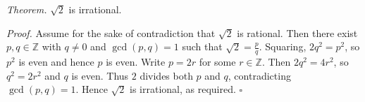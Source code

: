 \textit{Theorem.} $\sqrt{2}$ is irrational.

\textit{Proof.} Assume for the sake of contradiction that $\sqrt{2}$ is rational.
Then there exist $p, q \in \mathbb{Z}$ with $q \neq 0$ and $\gcd(p, q) = 1$ such that $\sqrt{2} = \frac{p}{q}$.
Squaring, $2q^{2} = p^{2}$, so $p^{2}$ is even and hence $p$ is even.
Write $p = 2r$ for some $r \in \mathbb{Z}$.
Then $2q^{2} = 4r^{2}$, so $q^{2} = 2r^{2}$ and $q$ is even.
Thus $2$ divides both $p$ and $q$, contradicting $\gcd(p, q) = 1$.
Hence $\sqrt{2}$ is irrational, as required. \hfill$\square$